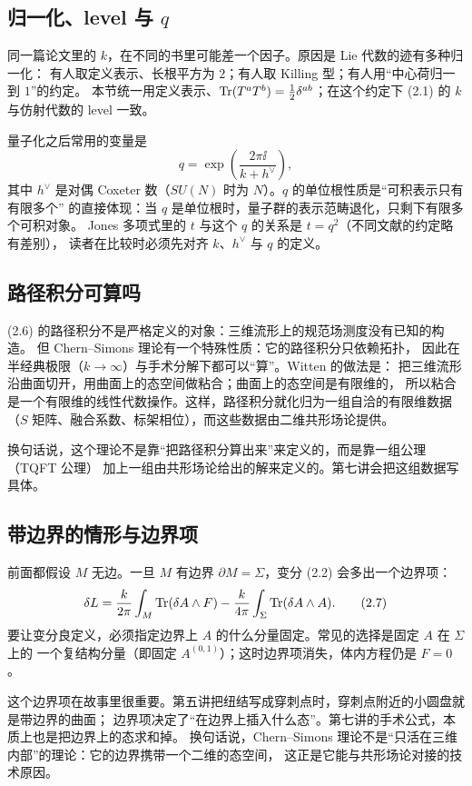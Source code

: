 \subsection{归一化、level 与 $q$}

同一篇论文里的 $k$，在不同的书里可能差一个因子。原因是 Lie 代数的迹有多种归一化：
有人取定义表示、长根平方为 $2$；有人取 Killing 型；有人用“中心荷归一到 $1$”的约定。
本节统一用定义表示、$\operatorname{Tr}(T^aT^b)=\frac12\delta^{ab}$；在这个约定下 (2.1) 的 $k$ 与仿射代数的 level 一致。

量子化之后常用的变量是
\[
q=\exp\left(\frac{2\pi\ii}{k+h^\vee}\right),
\]
其中 $h^\vee$ 是对偶 Coxeter 数（$SU(N)$ 时为 $N$）。$q$ 的单位根性质是“可积表示只有有限多个”
的直接体现：当 $q$ 是单位根时，量子群的表示范畴退化，只剩下有限多个可积对象。
Jones 多项式里的 $t$ 与这个 $q$ 的关系是 $t=q^{2}$（不同文献的约定略有差别），
读者在比较时必须先对齐 $k$、$h^\vee$ 与 $q$ 的定义。

\subsection{路径积分可算吗}

(2.6) 的路径积分不是严格定义的对象：三维流形上的规范场测度没有已知的构造。
但 Chern--Simons 理论有一个特殊性质：它的路径积分只依赖拓扑，
因此在半经典极限（$k\to\infty$）与手术分解下都可以“算”。Witten 的做法是：
把三维流形沿曲面切开，用曲面上的态空间做粘合；曲面上的态空间是有限维的，
所以粘合是一个有限维的线性代数操作。这样，路径积分就化归为一组自洽的有限维数据
（$S$ 矩阵、融合系数、标架相位），而这些数据由二维共形场论提供。

换句话说，这个理论不是靠“把路径积分算出来”来定义的，而是靠一组公理（TQFT 公理）
加上一组由共形场论给出的解来定义的。第七讲会把这组数据写具体。

\subsection{带边界的情形与边界项}

前面都假设 $M$ 无边。一旦 $M$ 有边界 $\partial M=\Sigma$，变分 (2.2) 会多出一个边界项：
\begin{equation}
\delta L=\frac{k}{2\pi}\int_M\operatorname{Tr}(\delta A\wedge F)
-\frac{k}{4\pi}\int_\Sigma\operatorname{Tr}(\delta A\wedge A). \tag{2.7}
\end{equation}
要让变分良定义，必须指定边界上 $A$ 的什么分量固定。常见的选择是固定 $A$ 在 $\Sigma$ 上的
一个复结构分量（即固定 $A^{(0,1)}$）；这时边界项消失，体内方程仍是 $F=0$。

这个边界项在故事里很重要。第五讲把纽结写成穿刺点时，穿刺点附近的小圆盘就是带边界的曲面；
边界项决定了“在边界上插入什么态”。第七讲的手术公式，本质上也是把边界上的态求和掉。
换句话说，Chern--Simons 理论不是“只活在三维内部”的理论：它的边界携带一个二维的态空间，
这正是它能与共形场论对接的技术原因。

